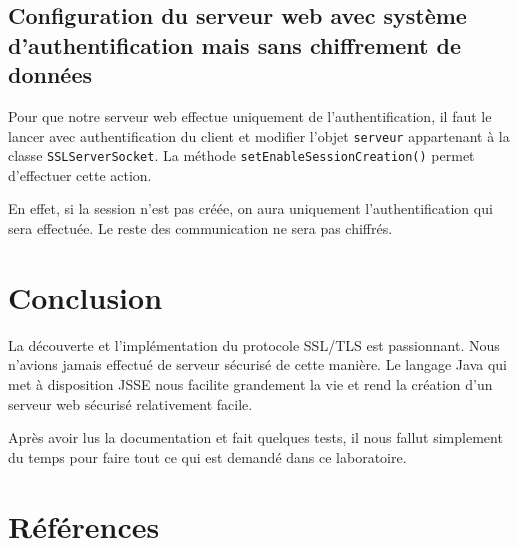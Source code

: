 \documentclass[10pt,a4paper,titlepage]{article}
\begin{document}
\subsection{Configuration du serveur web avec système d'authentification mais sans chiffrement de données}

Pour que notre serveur web effectue uniquement de l'authentification, il faut le lancer avec authentification du client et modifier l'objet \texttt{serveur} appartenant à la classe \texttt{SSLServerSocket}. La méthode \texttt{setEnableSessionCreation()} permet d'effectuer cette action.

En effet, si la session n'est pas créée, on aura uniquement l'authentification qui sera effectuée. Le reste des communication ne sera pas chiffrés.

\section{Conclusion}

La découverte et l'implémentation du protocole SSL/TLS est passionnant. Nous n'avions jamais effectué de serveur sécurisé de cette manière. Le langage Java qui met à disposition JSSE nous facilite grandement la vie et rend la création d'un serveur web sécurisé relativement facile. 

Après avoir lus la documentation et fait quelques tests, il nous fallut simplement du temps pour faire tout ce qui est demandé dans ce laboratoire.


\section{Références}
\end{document}
